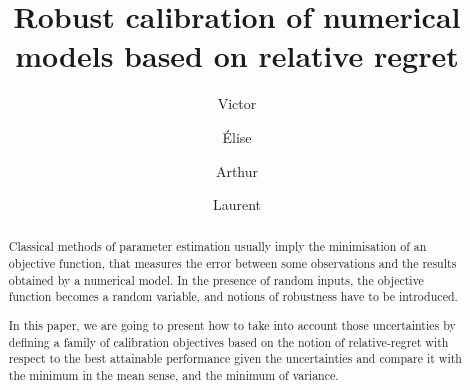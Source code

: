 \documentclass[preprint, 1p]{elsarticle}
\begin{document}
\begin{frontmatter}

\title{Robust calibration of numerical models based on relative regret}%

\author[1]{Victor }
\author[1]{Élise }
\author[2]{Arthur }
\author[2]{Laurent }

\address[1]{Univ. Grenoble Alpes, CNRS, Inria, Grenoble INP, LJK, 38000 Grenoble, France}
\address[2]{Univ. Grenoble Alpes, Inria, CNRS, Grenoble INP, LJK, 38000 Grenoble, France}
\received{}
\finalform{}
\accepted{}
\availableonline{}
\communicated{}

\begin{abstract}
Classical methods of parameter estimation usually imply the minimisation of an objective function, that measures the error between some observations and the results obtained by a numerical model. In the presence of random inputs, the objective function becomes a random variable, and notions of robustness have to be introduced.

In this paper, we are going to present how to take into account those uncertainties by defining a family of calibration objectives based on the notion of relative-regret with respect to the best attainable performance given the uncertainties and compare it with the minimum in the mean sense, and the minimum of variance.
\end{abstract}






\end{frontmatter}
\end{document}
